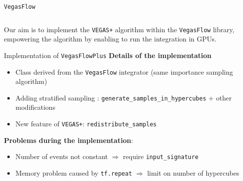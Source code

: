 \documentclass[t,handout,professionalfont,serif]{beamer}
\begin{document}
\begin{frame}[fragile]{\texttt{VegasFlow}}
\begin{columns}
		
	\end{columns}

Our aim is to implement the \texttt{VEGAS+} algorithm within the \texttt{VegasFlow} library, empowering the algorithm by enabling to run the integration in GPUs.




	
\end{frame}

\begin{frame}{Implementation of \texttt{VegasFlowPlus}}
	\scriptsize
	\textbf{Details of the implementation}
	\begin{itemize}
		\item Class derived from the \texttt{VegasFlow} integrator (same importance sampling algorithm)
		\item Adding stratified sampling : \texttt{generate\_samples\_in\_hypercubes} + other modifications
		\item New feature of \texttt{VEGAS+}: \texttt{redistribute\_samples}
	\end{itemize}
	
	\vspace{2cm}
	
	\textbf{Problems during the implementation}:
	\begin{itemize}
		\item Number of events not constant $\Rightarrow$ require \texttt{input\_signature}
		\item Memory problem caused by \texttt{tf.repeat} $\Rightarrow$ limit on number of hypercubes
	\end{itemize}
\end{frame}
\end{document}
